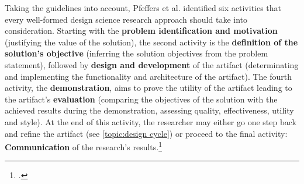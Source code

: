 Taking the guidelines into account, Pfeffers et al. identified six activities that every well-formed design science research approach should take into consideration. Starting with the \textbf{problem identification and motivation} (justifying the value of the solution), the second activity is the \textbf{definition of the solution's objective} (inferring the solution objectives from the problem statement), followed by \textbf{design and development} of the artifact (determinating and implementing the functionality and architecture of the artifact). The fourth activity, the \textbf{demonstration}, aims to prove the utility of the artifact leading to the artifact's \textbf{evaluation} (comparing the objectives of the solution with the achieved results during the demonstration, assessing quality, effectiveness, utility and style). At the end of this activity, the researcher may either go one step back and refine the artifact (see \ref{topic:design cycle}) or proceed to the final activity: \textbf{Communication} of the research's results.\footcite[Cf.][pp.12 et seq]{PfeffersDesignScienceResearch2007}


